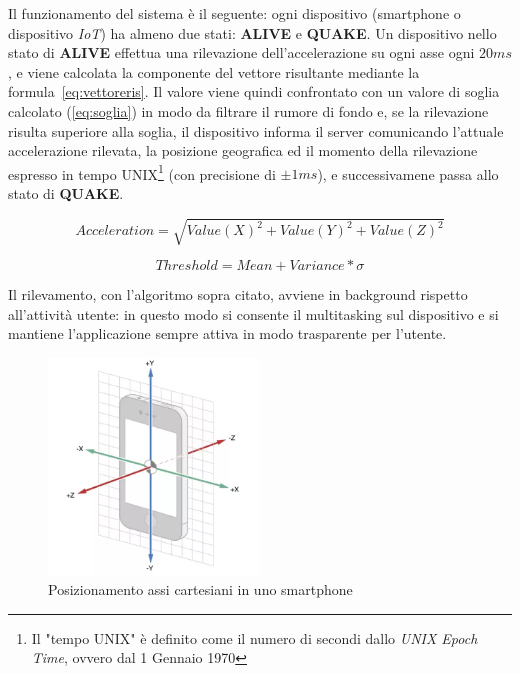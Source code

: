 \documentclass[a4paper,10pt]{memoir}
\begin{document}
Il funzionamento del sistema è il seguente: ogni dispositivo (smartphone o dispositivo \textit{IoT}) ha almeno due stati: \textbf{ALIVE} e \textbf{QUAKE}. Un dispositivo nello stato di \textbf{ALIVE} effettua una rilevazione dell'accelerazione su ogni asse ogni $20ms$, e viene calcolata la componente del vettore risultante mediante la formula~\ref{eq:vettoreris}. Il valore viene quindi confrontato con un valore di soglia calcolato (\ref{eq:soglia}) in modo da filtrare il rumore di fondo e, se la rilevazione risulta superiore alla soglia, il dispositivo informa il server comunicando l'attuale accelerazione rilevata, la posizione geografica ed il momento della rilevazione espresso in tempo UNIX\footnote{Il "tempo UNIX" è definito come il numero di secondi dallo \textit{UNIX Epoch Time}, ovvero dal 1 Gennaio 1970} (con precisione di $\pm1ms$), e successivamene passa allo stato di \textbf{QUAKE}.

\begin{equation} \label{eq:vettoreris}
Acceleration = \sqrt{Value(X)^2 + Value(Y)^2 + Value(Z)^2}
\end{equation}

\begin{equation} \label{eq:soglia}
Threshold = Mean + Variance * \sigma
\end{equation}

Il rilevamento, con l'algoritmo sopra citato, avviene in background rispetto all'attività utente: in questo modo si consente il multitasking sul dispositivo e si mantiene l'applicazione sempre attiva in modo trasparente per l'utente.

\begin{figure}[ht]
\centering
\caption{Posizionamento assi cartesiani in uno smartphone}
\label{fig:scsaxes}
\includegraphics[width=0.5\textwidth]{introduzione/smartphone_axes}
\end{figure}
\end{document}
